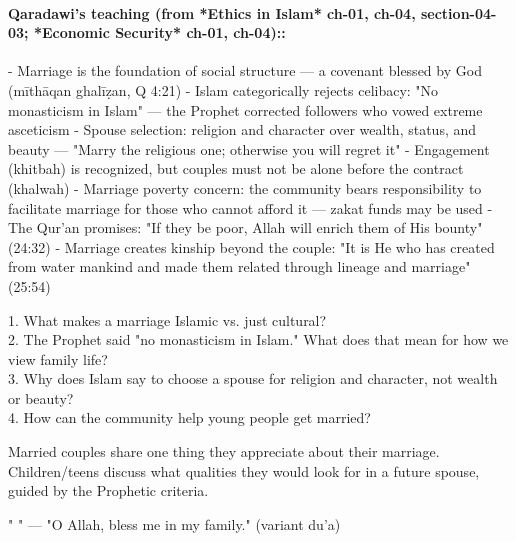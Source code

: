 \documentclass[11pt,a4paper]{article}
\begin{document}
\paragraph*{Qaradawi's teaching (from *Ethics in Islam* ch-01, ch-04, section-04-03; *Economic Security* ch-01, ch-04)::}  - Marriage is the foundation of social structure --- a covenant blessed by God (mīthāqan ghalīẓan, Q 4:21) - Islam categorically rejects celibacy: "No monasticism in Islam" --- the Prophet corrected followers who vowed extreme asceticism - Spouse selection: religion and character over wealth, status, and beauty --- "Marry the religious one; otherwise you will regret it" - Engagement (khitbah) is recognized, but couples must not be alone before the contract (khalwah) - Marriage poverty concern: the community bears responsibility to facilitate marriage for those who cannot afford it --- zakat funds may be used - The Qur'an promises: "If they be poor, Allah will enrich them of His bounty" (24:32) - Marriage creates kinship beyond the couple: "It is He who has created from water mankind and made them related through lineage and marriage" (25:54)

\begin{discussionbox} 1. What makes a marriage Islamic vs. just cultural? \\ 2. The Prophet said "no monasticism in Islam." What does that mean for how we view family life? \\ 3. Why does Islam say to choose a spouse for religion and character, not wealth or beauty? \\ 4. How can the community help young people get married? \end{discussionbox}

\begin{activitybox} Married couples share one thing they appreciate about their marriage. Children/teens discuss what qualities they would look for in a future spouse, guided by the Prophetic criteria. \end{activitybox}

\begin{duabox} "    " --- "O Allah, bless me in my family." (variant du'a) \end{duabox}

\vspace{6pt}\noindent{\color{border}\rule{\textwidth}{0.5pt}}\vspace{6pt}
\end{document}
